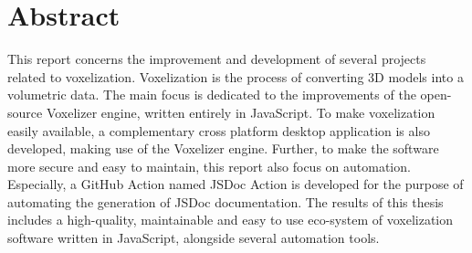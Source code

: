 \section*{Abstract}
This report concerns the improvement and development of several projects related to voxelization. Voxelization is the process of converting 3D models into a volumetric data. The main focus is dedicated to the improvements of the open-source Voxelizer engine, written entirely in JavaScript. To make voxelization easily available, a complementary cross platform desktop application is also developed, making use of the Voxelizer engine. Further, to make the software more secure and easy to maintain, this report also focus on automation. Especially, a GitHub Action named JSDoc Action is developed for the purpose of automating the generation of JSDoc documentation. The results of this thesis includes a high-quality, maintainable and easy to use eco-system of voxelization software written in JavaScript, alongside several automation tools.

